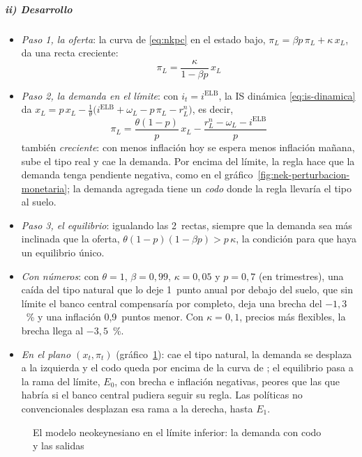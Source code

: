 \documentclass[11pt]{article}
\begin{document}
\subparagraph{ii) Desarrollo}
\begin{itemize}
\item \emph{Paso 1, la oferta}: la curva de  \eqref{eq:nkpc} en el estado bajo, $\pi_L=\beta p\,\pi_L+\kappa\,x_L$, da una recta creciente:
  \[\pi_L=\frac{\kappa}{1-\beta p}\,x_L\]
\item \emph{Paso 2, la demanda en el límite}: con $i_t=i^{\mathrm{ELB}}$, la IS dinámica \eqref{eq:is-dinamica} da $x_L=p\,x_L-\frac1\theta\big(i^{\mathrm{ELB}}+\omega_L-p\,\pi_L-r^n_L\big)$, es decir,
  \[\pi_L=\frac{\theta(1-p)}{p}\,x_L-\frac{r^n_L-\omega_L-i^{\mathrm{ELB}}}{p}\]
  también \emph{creciente}: con menos inflación hoy se espera menos inflación mañana, sube el tipo real y cae la demanda. Por encima del límite, la regla hace que la demanda tenga pendiente negativa, como en el gráfico~\ref{fig:nek-perturbacion-monetaria}; la demanda agregada tiene un \emph{codo} donde la regla llevaría el tipo al suelo.
\item \emph{Paso 3, el equilibrio}: igualando las 2~rectas,
  siempre que la demanda sea más inclinada que la oferta, $\theta(1-p)(1-\beta p)>p\,\kappa$, la condición para que haya un equilibrio único.
\item \emph{Con números}: con $\theta=1$, $\beta=0{,}99$, $\kappa=0{,}05$ y $p=0{,}7$ (en trimestres), una caída del tipo natural que lo deje 1~punto anual por debajo del suelo, que sin límite el banco central compensaría por completo, deja una brecha del $-1{,}3$~\% y una inflación 0,9~puntos menor. Con $\kappa=0{,}1$, precios más flexibles, la brecha llega al $-3{,}5$~\%.
\item \emph{En el plano $(x_t,\pi_t)$} (gráfico~\ref{fig:nek-limite-inferior}): cae el tipo natural, la demanda se desplaza a la izquierda y el codo queda por encima de la curva de ; el equilibrio pasa a la rama del límite, $E_0$, con brecha e inflación negativas, peores que las que habría si el banco central pudiera seguir su regla. Las políticas no convencionales desplazan esa rama a la derecha, hasta $E_1$.
\end{itemize}

\begin{figure}[H]
\centering
\caption{El modelo neokeynesiano en el límite inferior: la demanda con codo y las salidas}\label{fig:nek-limite-inferior}
\end{figure}
\end{document}
